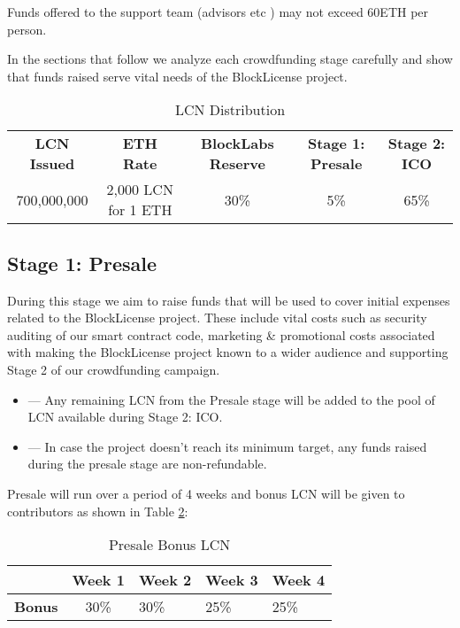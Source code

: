 Funds offered to the support team (advisors etc ) may not exceed 60ETH per person.

In the sections that follow we analyze each crowdfunding stage carefully and show that funds raised serve vital needs of the BlockLicense project.


\begin{table}[!htbp]
\begin{center}
\begin{tabular}{c c c c c}
& & \\ %
\toprule
\textbf{LCN Issued} & \textbf{ETH Rate} & \textbf{BlockLabs Reserve}  & \textbf{Stage 1: Presale} & \textbf{Stage 2: ICO} \\
\midrule
700,000,000 & 2,000 LCN for 1 ETH & 30\% & 5\% & 65\% \\
\bottomrule
\end{tabular}
\end{center}
\caption{LCN Distribution}
\label{table:coindistribution}
\end{table}



\subsection{Stage 1: Presale}


During this stage we aim to raise funds that will be used to cover initial expenses related to the BlockLicense project. These include vital costs such as security auditing of our smart contract code, marketing \& promotional costs associated with making the BlockLicense project known to a wider audience and supporting Stage 2 of our crowdfunding campaign.


\begin{itemize}
\item --- Any remaining LCN from the Presale stage will be added to the pool of LCN available during Stage 2: ICO.
\item --- In case the project doesn't reach its minimum target, any funds raised during the presale stage are non-refundable. 
\end{itemize}

Presale will run over a period of 4 weeks and bonus LCN will be given to contributors as shown in Table \ref{presale-bonus}:

\begin{table}[!htbp]
\centering
\begin{tabular}{@{}lclll@{}}
\toprule
& \textbf{Week 1} & \multicolumn{1}{c}{\textbf{Week 2}} & \multicolumn{1}{c}{\textbf{Week 3}} & \multicolumn{1}{c}{\textbf{Week 4}} \\ 
\midrule
\multicolumn{1}{r}{\textbf{Bonus}} & 30\%            & 30\%                                & 25\%                                & 25\%   \\ 
\bottomrule
\end{tabular}
\caption{Presale Bonus LCN}
\label{presale-bonus}
\end{table}

